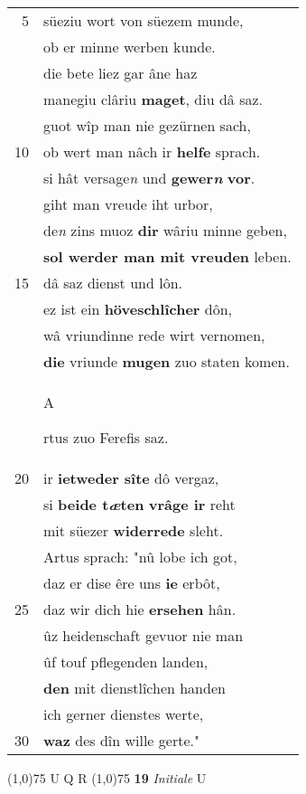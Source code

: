 \documentclass[8pt,a4paper,notitlepage]{article}
\begin{document}
\begin{table}[ht]
\begin{minipage}[t]{0.5\linewidth}
\begin{tabular}{rl}
5 & süeziu wort von süezem munde,\\ 
 & ob er minne werben kunde.\\ 
 & die bete liez gar âne haz\\ 
 & manegiu clâriu \textbf{maget}, diu dâ saz.\\ 
 & guot wîp man nie gezürnen sach,\\ 
10 & ob wert man nâch ir \textbf{helfe} sprach.\\ 
 & si hât versage\textit{n} und \textbf{gewer\textit{n}} \textbf{vor}.\\ 
 & giht man vreude iht urbor,\\ 
 & de\textit{n} zins muoz \textbf{dir} wâriu minne geben,\\ 
 & \textbf{sol werder man mit vreuden} leben.\\ 
15 & dâ saz dienst und lôn.\\ 
 & ez ist ein \textbf{höveschlîcher} dôn,\\ 
 & wâ vriundinne rede wirt vernomen,\\ 
 & \textbf{die} vriunde \textbf{mugen} zuo staten komen.\\ 
 & \begin{large}A\end{large}rtus zuo Ferefis saz.\\ 
20 & ir \textbf{ietweder sîte} dô vergaz,\\ 
 & si \textbf{beide t\textit{æ}ten} \textbf{vrâge ir} reht\\ 
 & mit süezer \textbf{widerrede} sleht.\\ 
 & Artus sprach: "nû lobe ich got,\\ 
 & daz er dise êre uns \textbf{ie} erbôt,\\ 
25 & daz wir dich hie \textbf{ersehen} hân.\\ 
 & ûz heidenschaft gevuor nie man\\ 
 & ûf touf pflegenden landen,\\ 
 & \textbf{den} mit dienstlîchen handen\\ 
 & ich gerner dienstes werte,\\ 
30 & \textbf{waz} des dîn wille gerte."\\ 
\end{tabular}
\scriptsize
\line(1,0){75} \newline
U Q R \newline
\line(1,0){75} \newline
\textbf{19} \textit{Initiale} U  \newline

\end{minipage}
\end{table}
\end{document}
